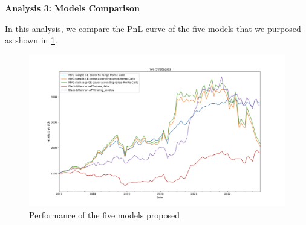 \documentclass[13pt]{article}
\theoremstyle{definition}
\theoremstyle{remark}
\begin{document}
\newpage
{\color{C6}\textbf{Analysis 3: Models Comparison}}

In this analysis, we compare the PnL curve of the five models that we purposed as shown in \cref{fig:five strategies}.
\begin{figure}
    \centering
    \includegraphics[width=1\textwidth]{five strategies.png}
    \caption{Performance of the five models proposed}
    \label{fig:five strategies}
\end{figure}
\end{document}

